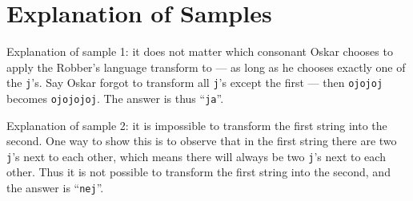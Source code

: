 \section*{Explanation of Samples}
Explanation of sample 1: it does not matter which consonant Oskar chooses to apply the Robber's language transform to --- as long as
he chooses exactly one of the \texttt{j}'s. Say Oskar forgot to transform all \texttt{j}'s except the first --- then \texttt{ojojoj} becomes \texttt{ojojojoj}. The answer is thus ``\texttt{ja}''.

Explanation of sample 2: it is impossible to transform the first string into the second. One way to show this is to observe that in the first string there are two \texttt{j}'s next to each other, which means there will always be two \texttt{j}'s next to each other. Thus it is not possible to transform the first string into the second, and the answer is ``\texttt{nej}''.
